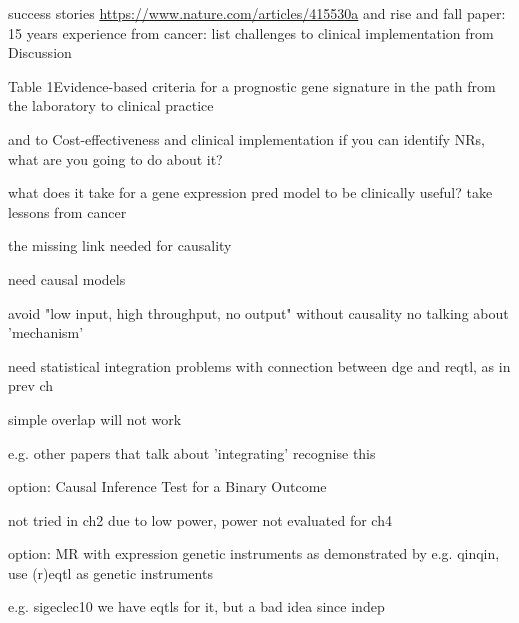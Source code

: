 \begin{outline}
            success stories \url{https://www.nature.com/articles/415530a} 
            and
            rise and fall paper: 15 years experience from cancer: list challenges to clinical implementation from Discussion

            Table 1Evidence-based criteria for a prognostic gene signature in the path from the laboratory to clinical practice

    and to Cost-effectiveness and clinical implementation
        if you can identify NRs, what are you going to do about it?

        what does it take for a gene expression pred model to be clinically useful?
            take lessons from cancer

the missing link needed for causality

    need causal models

        avoid "low input, high throughput, no output"
        without causality no talking about 'mechanism'

    need statistical integration
        problems with connection between dge and reqtl, as in prev ch

        simple overlap will not work

            e.g. other papers that talk about 'integrating' recognise this

    option:
        Causal Inference Test for a Binary Outcome

            not tried in ch2 due to low power, power not evaluated for ch4

    option: MR with expression 
        genetic instruments
        as demonstrated by e.g. qinqin, use (r)eqtl as genetic instruments

        e.g. sigeclec10
        we have eqtls for it, but a bad idea since indep


\end{outline}
